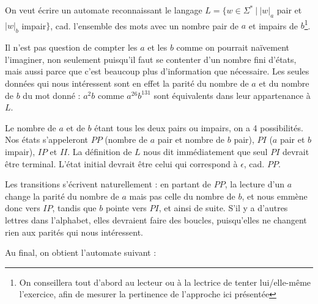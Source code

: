 \begin{example}
\label{exemplePI}
On veut écrire un automate reconnaissant le langage $L = \{w \in \Sigma^*~|~|w|_a$ pair et $|w|_b$ impair$\}$, cad. l'ensemble des mots avec un nombre pair de $a$ et impairs de $b$\footnote{On conseillera tout d'abord au lecteur ou à la lectrice de tenter lui/elle-même l'exercice, afin de mesurer la pertinence de l'approche ici présentée}.

Il n'est pas question de compter les $a$ et les $b$ comme on pourrait naïvement l'imaginer, non seulement puisqu'il faut se contenter d'un nombre fini d'états, mais aussi parce que c'est beaucoup plus d'information que nécessaire.
Les seules données qui nous intéressent sont en effet la parité du nombre de $a$ et du nombre de $b$ du mot donné : $a^2b$ comme $a^{26}b^{131}$ sont équivalents dans leur appartenance à $L$.

Le nombre de $a$ et de $b$ étant tous les deux pairs ou impairs, on a 4 possibilités. Nos états s'appeleront $PP$ (nombre de $a$ pair et nombre de $b$ pair), $PI$ ($a$ pair et $b$ impair), $IP$ et $II$. La définition de $L$ nous dit immédiatement que seul $PI$ devrait être terminal. L'état initial devrait être celui qui correspond à $\epsilon$, cad. $PP$.

Les transitions s'écrivent naturellement : en partant de $PP$, la lecture d'un $a$ change la parité du nombre de $a$ mais pas celle du nombre de $b$, et nous emmène donc vers $IP$, tandis que $b$ pointe vers $PI$, et ainsi de suite. S'il y a d'autres lettres dans l'alphabet, elles devraient faire des boucles, puisqu'elles ne changent rien aux parités qui nous intéressent.

Au final, on obtient l'automate suivant : 


\centering
{}
\end{example}

